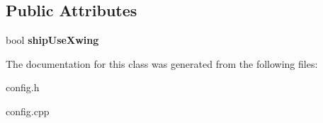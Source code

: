\subsection*{Public Attributes}
\begin{DoxyCompactItemize}
\item 
\mbox{\label{classgame_1_1Config_ae391a4ba5131c1a5d43b7a8024af43aa}} 
bool {\bfseries ship\+Use\+Xwing}
\end{DoxyCompactItemize}


The documentation for this class was generated from the following files\+:\begin{DoxyCompactItemize}
\item 
config.\+h\item 
config.\+cpp\end{DoxyCompactItemize}
